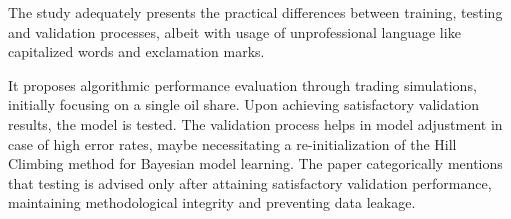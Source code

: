 The study adequately presents the practical differences between training, testing and validation processes, albeit with usage of unprofessional language like capitalized words and exclamation marks. 

It proposes algorithmic performance evaluation through trading simulations, initially focusing on a single oil share. Upon achieving satisfactory validation results, the model is tested. The validation process helps in model adjustment in case of high error rates, maybe necessitating a  re-initialization of the Hill Climbing method for Bayesian model learning. The paper categorically mentions that testing is advised only after attaining satisfactory validation performance, maintaining methodological integrity and preventing data leakage.